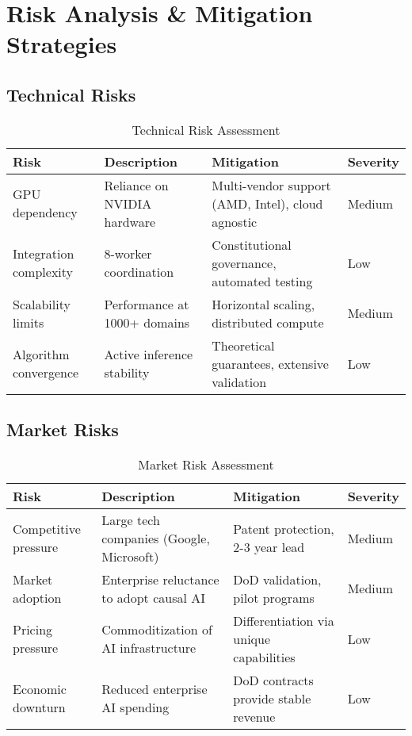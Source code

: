 \documentclass[11pt,letterpaper]{article}
\begin{document}
\newpage

\section{Risk Analysis \& Mitigation Strategies}

\subsection{Technical Risks}

\begin{table}[H]
\centering
\begin{tabularx}{\textwidth}{lXXl}
\toprule
\textbf{Risk} & \textbf{Description} & \textbf{Mitigation} & \textbf{Severity} \\
\midrule
GPU dependency & Reliance on NVIDIA hardware & Multi-vendor support (AMD, Intel), cloud agnostic & Medium \\
Integration complexity & 8-worker coordination & Constitutional governance, automated testing & Low \\
Scalability limits & Performance at 1000+ domains & Horizontal scaling, distributed compute & Medium \\
Algorithm convergence & Active inference stability & Theoretical guarantees, extensive validation & Low \\
\bottomrule
\end{tabularx}
\caption{Technical Risk Assessment}
\end{table}

\subsection{Market Risks}

\begin{table}[H]
\centering
\begin{tabularx}{\textwidth}{lXXl}
\toprule
\textbf{Risk} & \textbf{Description} & \textbf{Mitigation} & \textbf{Severity} \\
\midrule
Competitive pressure & Large tech companies (Google, Microsoft) & Patent protection, 2-3 year lead & Medium \\
Market adoption & Enterprise reluctance to adopt causal AI & DoD validation, pilot programs & Medium \\
Pricing pressure & Commoditization of AI infrastructure & Differentiation via unique capabilities & Low \\
Economic downturn & Reduced enterprise AI spending & DoD contracts provide stable revenue & Low \\
\bottomrule
\end{tabularx}
\caption{Market Risk Assessment}
\end{table}
\end{document}

